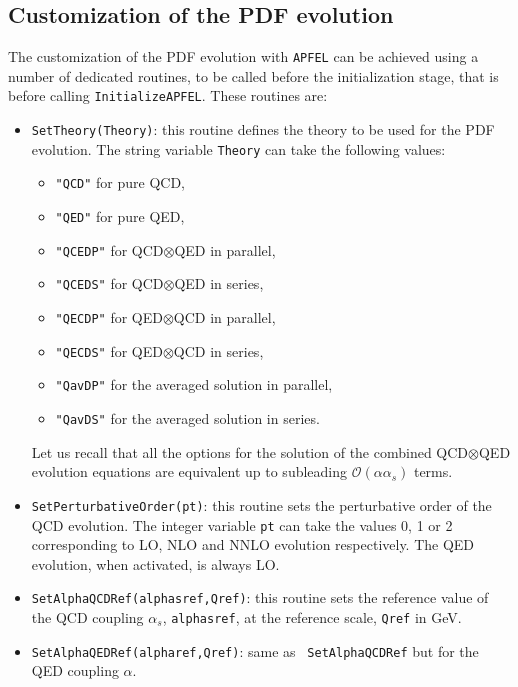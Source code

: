 \documentclass[11pt,a4paper]{article}
\newcommand{\lp}{\left(}
\newcommand{\rp}{\right)}
\begin{document}
\subsection{Customization of the PDF evolution}\label{EvolCustom}

%
The customization of the PDF evolution with {\tt APFEL} can be achieved using a number of dedicated 
routines, to be called before the initialization stage, that is before
calling {\tt InitializeAPFEL}.
%
These routines are:
\begin{itemize}

\item {\tt SetTheory(Theory)}: this routine defines the theory to be used
  for the PDF evolution. The string variable {\tt Theory} can take
  the following values:
\begin{itemize}
\item {\tt "QCD"} for pure QCD,
\item {\tt "QED"} for pure QED,
\item {\tt "QCEDP"} for QCD$\otimes$QED in parallel,
\item {\tt "QCEDS"} for QCD$\otimes$QED in series,
\item {\tt "QECDP"} for QED$\otimes$QCD in parallel,
\item {\tt "QECDS"} for QED$\otimes$QCD in series,
\item {\tt "QavDP"} for the averaged solution in parallel,
\item {\tt "QavDS"} for the averaged solution in series.
\end{itemize}
Let us recall that all the options for the solution of the combined
QCD$\otimes$QED evolution equations are equivalent up to subleading $\mathcal{O}\lp \alpha \alpha_s\rp$
terms.

\item {\tt SetPerturbativeOrder(pt)}: this routine sets the
  perturbative order of the QCD evolution. 
%
The integer variable {\tt pt} can
  take the values 0, 1 or 2 corresponding to LO, NLO and NNLO
  evolution respectively.
%
The QED evolution, when activated, is always LO.

\item {\tt SetAlphaQCDRef(alphasref,Qref)}: this routine sets the
 reference value of the QCD coupling $\alpha_s$, {\tt alphasref},
 at the reference scale, {\tt Qref} in GeV. 
%

\item {\tt SetAlphaQEDRef(alpharef,Qref)}: same as {\tt
    SetAlphaQCDRef} but for the QED coupling $\alpha$.


\end{itemize}
\end{document}
